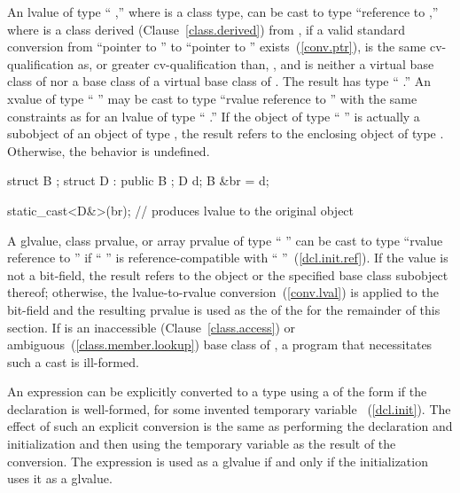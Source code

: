 \pnum
{}%
%
An lvalue of type `` ,'' where  is a class
type, can be cast to type ``reference to  ,'' where
 is a class derived (Clause~\ref{class.derived}) from
, if a valid standard conversion from ``pointer to ''
to ``pointer to '' exists~(\ref{conv.ptr}),  is the
same cv-qualification as, or greater cv-qualification than,
, and  is neither a virtual base class of 
nor a base class of a virtual base class of . The result has
type `` .'' An xvalue of type
`` '' may be cast to type ``rvalue reference to
 '' with the same constraints as for an lvalue of
type `` .'' If the object
of type `` '' is actually a subobject of an object
of type , the result refers to the enclosing object of type
. Otherwise, the behavior is undefined.
\enterexample 

\begin{codeblock}
struct B { };
struct D : public B { };
D d;
B &br = d;

static_cast<D&>(br);            // produces lvalue to the original  object
\end{codeblock}
\exitexample 

\pnum
A glvalue, class prvalue, or array prvalue
of type `` '' can be cast to type ``rvalue
reference to  '' if `` '' is
reference-compatible with ``
''~(\ref{dcl.init.ref}). If the value is not a bit-field,
the result refers to the object or the specified base class subobject
thereof; otherwise, the lvalue-to-rvalue conversion~(\ref{conv.lval})
is applied to the bit-field and the resulting prvalue is used as the
 of the  for the remainder of this section.
If  is an inaccessible (Clause~\ref{class.access}) or
ambiguous~(\ref{class.member.lookup}) base class of ,
a program that necessitates such a cast is ill-formed.

\pnum
An expression  can be explicitly converted to a type
 using a  of the form
 if the declaration  is
well-formed, for some invented temporary variable
~(\ref{dcl.init}). The effect of such an explicit conversion is
the same as performing the declaration and initialization and then using
the temporary variable as the result of the conversion. The expression
 is used as a glvalue if and
only if the initialization uses it as a glvalue.

